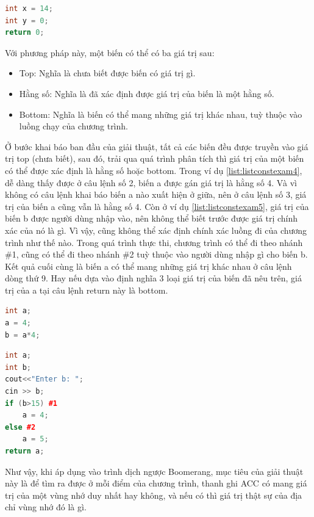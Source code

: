 \begin{lstlisting}[caption={Đoạn mã sau khi thực hiện lan truyền hằng số cho biểu thức trả về},label={list:listconstexam3}, language=c++]
int x = 14;
int y = 0;
return 0;
\end{lstlisting}
Với phương pháp này, một biến có thể có ba giá trị sau:
\begin{itemize}
	\item Top: Nghĩa là chưa biết được biến có giá trị gì.
	\item Hằng số: Nghĩa là đã xác định được giá trị của biến là một hằng số.
	\item Bottom: Nghĩa là biến có thể mang những giá trị khác nhau, tuỳ thuộc vào luồng chạy của chương trình.
\end{itemize}

Ở bước khai báo ban đầu của giải thuật, tất cả các biến đều được truyền vào giá trị top (chưa biết), sau đó, trải qua quá trình phân tích thì giá trị của một biến có thể được xác định là hằng số hoặc bottom. Trong ví dụ \ref{list:listconstexam4}, dễ dàng thấy được ở câu lệnh số 2, biến a được gán giá trị là hằng số 4. Và vì không có câu lệnh khai báo biến a nào xuất hiện ở giữa, nên ở câu lệnh số 3, giá trị của biến a cũng vẫn là hằng số 4. Còn ở ví dụ \ref{list:listconstexam5}, giá trị của biến b được người dùng nhập vào, nên không thể biết trước được giá trị chính xác của nó là gì. Vì vậy, cũng không thể xác định chính xác luồng đi của chương trình như thế nào. Trong quá trình thực thi, chương trình có thể đi theo nhánh \#1, cũng có thể đi theo nhánh \#2 tuỳ thuộc vào người dùng nhập gì cho biến b. Kết quả cuối cùng là biến a có thể mang những giá trị khác nhau ở câu lệnh dòng thứ 9. Hay nếu dựa vào định nghĩa 3 loại giá trị của biến đã nêu trên, giá trị của a tại câu lệnh return này là bottom.
\begin{lstlisting}[caption={Đoạn mã ví dụ biến có giá trị là hằng số},label={list:listconstexam4}, language=c++]
int a;
a = 4;
b = a*4;
\end{lstlisting}
\begin{lstlisting}[caption={Đoạn mã ví dụ biến có giá trị là bottom},label={list:listconstexam5}, language=c++]
int a;
int b;
cout<<"Enter b: ";
cin >> b;
if (b>15) #1
	a = 4;
else #2
	a = 5;
return a;
\end{lstlisting}

Như vậy, khi áp dụng vào trình dịch ngược Boomerang, mục tiêu của giải thuật này là để tìm ra được ở mỗi điểm của chương trình, thanh ghi ACC có mang giá trị của một vùng nhớ duy nhất hay không, và nếu có thì giá trị thật sự của địa chỉ vùng nhớ đó là gì.

